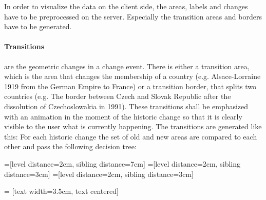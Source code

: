 In order to visualize the data on the client side, the areas, labels and changes have to be preprocessed on the server. Especially the transition areas and borders have to be generated.

\paragraph{Transitions} are the geometric changes in a change event. There is either a transition area, which is the area that changes the membership of a country (e.g. Alsace-Lorraine 1919 from the German Empire to France) or a transition border, that splits two countries (e.g. The border between Czech and Slovak Republic after the dissolution of Czechoslowakia in 1991). These transitions shall be emphasized with an animation in the moment of the historic change so that it is clearly visible to the user what is currently happening. The transitions are generated like this: For each historic change the set of old and new areas are compared to each other and pass the following decision tree:

=[level distance=2cm, sibling distance=7cm]
=[level distance=2cm, sibling distance=3cm]
=[level distance=2cm, sibling distance=3cm]

 = [text width=3.5cm, text centered]

